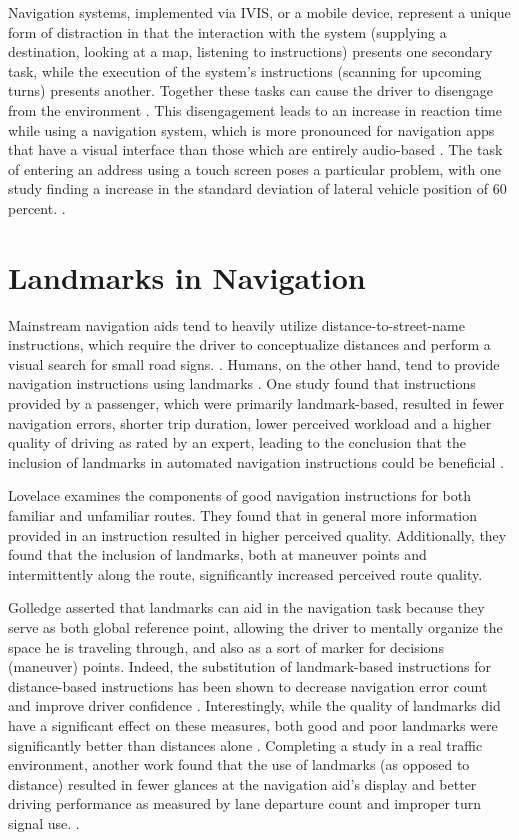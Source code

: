 Navigation systems, implemented via IVIS, or a mobile device, represent a unique form of distraction in that the interaction with the system (supplying a destination, looking at a map, listening to instructions) presents one secondary task, while the execution of the system's instructions (scanning for upcoming turns) presents another. Together these tasks can cause the driver to disengage from the environment \cite{leshed2008car}. This disengagement leads to an increase in reaction time while using a navigation system, which is more pronounced for navigation apps that have a visual interface than those which are entirely audio-based \cite{harms2003peripheral}. The task of entering an address using a touch screen poses a particular problem, with one study finding a increase in the standard deviation of lateral vehicle position of 60 percent. \cite{tsimhoni2004address}.

\section{Landmarks in Navigation}

Mainstream navigation aids tend to heavily utilize distance-to-street-name instructions, which require the driver to conceptualize distances and perform a visual search for small road signs. \cite{burnett2000turn}. Humans, on the other hand, tend to provide navigation instructions using landmarks \cite{zaidel1997automatic}. One study found that instructions provided by a passenger, which were primarily landmark-based, resulted in fewer navigation errors, shorter trip duration, lower perceived workload and a higher quality of driving as rated by an expert, leading to the conclusion that the inclusion of landmarks in automated navigation instructions could be beneficial \cite{burnett1997assessment}. 

Lovelace \cite{lovelace1999elements} examines the components of good navigation instructions for both familiar and unfamiliar routes.  They found that in general more information provided in an instruction resulted in higher perceived quality. Additionally, they found that the inclusion of landmarks, both at maneuver points and intermittently along the route, significantly increased perceived route quality.

Golledge \cite{golledge2003human} asserted that landmarks can aid in the navigation task because they serve as both global reference point, allowing the driver to mentally organize the space he is traveling through, and also as a sort of marker for decisions (maneuver) points. Indeed, the substitution of landmark-based instructions for distance-based instructions has been shown to decrease navigation error count and improve driver confidence \cite{may2005incorporating}. Interestingly, while the quality of landmarks did have a significant effect on these measures, both good and poor landmarks were significantly better than distances alone \cite{may2005incorporating}. Completing a study in a real traffic environment, another work found that the use of landmarks (as opposed to distance) resulted in fewer glances at the navigation aid's display and better driving performance as measured by lane departure count and improper turn signal use. \cite{may2006presence}.

